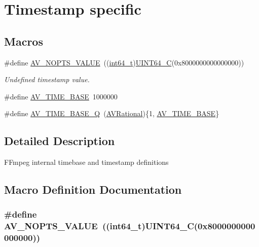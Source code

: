 \hypertarget{group__lavu__time}{}\section{Timestamp specific}
\label{group__lavu__time}
\subsection*{Macros}
\begin{DoxyCompactItemize}
\item 
\#define \hyperlink{group__lavu__time_ga2eaefe702f95f619ea6f2d08afa01be1}{A\+V\+\_\+\+N\+O\+P\+T\+S\+\_\+\+V\+A\+L\+UE}~((\hyperlink{lib-src_2ffmpeg_2win32_2stdint_8h_a67a9885ef4908cb72ce26d75b694386c}{int64\+\_\+t})\hyperlink{win_2_l_a_d_s_p_a__plugins-win_2glibc__includes_2stdint_8h_a26a7bac63d90ef61175acb9f6fc4f2ca}{U\+I\+N\+T64\+\_\+C}(0x8000000000000000))
\begin{DoxyCompactList}\small\item\em Undefined timestamp value. \end{DoxyCompactList}\item 
\#define \hyperlink{group__lavu__time_gaa11ed202b70e1f52bac809811a910e2a}{A\+V\+\_\+\+T\+I\+M\+E\+\_\+\+B\+A\+SE}~1000000
\item 
\#define \hyperlink{group__lavu__time_gafd07a13a4ddaa6015275cad6022d9ee3}{A\+V\+\_\+\+T\+I\+M\+E\+\_\+\+B\+A\+S\+E\+\_\+Q}~(\hyperlink{struct_a_v_rational}{A\+V\+Rational})\{1, \hyperlink{group__lavu__time_gaa11ed202b70e1f52bac809811a910e2a}{A\+V\+\_\+\+T\+I\+M\+E\+\_\+\+B\+A\+SE}\}
\end{DoxyCompactItemize}


\subsection{Detailed Description}
F\+Fmpeg internal timebase and timestamp definitions 

\subsection{Macro Definition Documentation}
\subsubsection[{\texorpdfstring{A\+V\+\_\+\+N\+O\+P\+T\+S\+\_\+\+V\+A\+L\+UE}{AV_NOPTS_VALUE}}]{\setlength{\rightskip}{0pt plus 5cm}\#define A\+V\+\_\+\+N\+O\+P\+T\+S\+\_\+\+V\+A\+L\+UE~(({\bf int64\+\_\+t}){\bf U\+I\+N\+T64\+\_\+C}(0x8000000000000000))}\hypertarget{group__lavu__time_ga2eaefe702f95f619ea6f2d08afa01be1}{}\label{group__lavu__time_ga2eaefe702f95f619ea6f2d08afa01be1}


